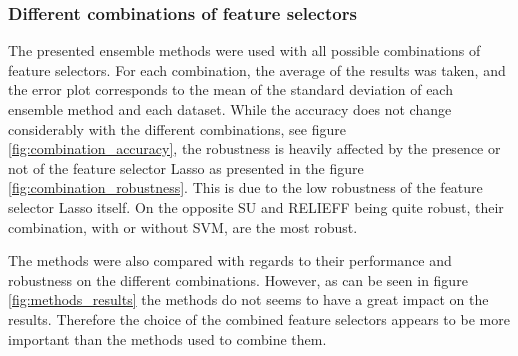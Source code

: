 \documentclass[twoside,11pt]{article}
\begin{document}
\subsubsection{Different combinations of feature selectors}
The presented ensemble methods were used with all possible combinations of feature selectors. For each combination, the average of the results was taken, and the error plot corresponds to the mean of the standard deviation of each ensemble method and each dataset. While the accuracy does not change considerably with the different combinations, see figure \ref{fig:combination_accuracy}, the robustness is heavily affected by the presence or not of the feature selector Lasso as presented in the figure \ref{fig:combination_robustness}. This is due to the low robustness of the feature selector Lasso itself. On the opposite SU and RELIEFF being quite robust, their combination, with or without SVM, are the most robust.  

The methods were also compared with regards to their performance and robustness on the different combinations. However, as can be seen in figure \ref{fig:methods_results} the methods do not seems to have a great impact on the results. Therefore the choice of the combined feature selectors appears to be more important than the methods used to combine them.
\end{document}
